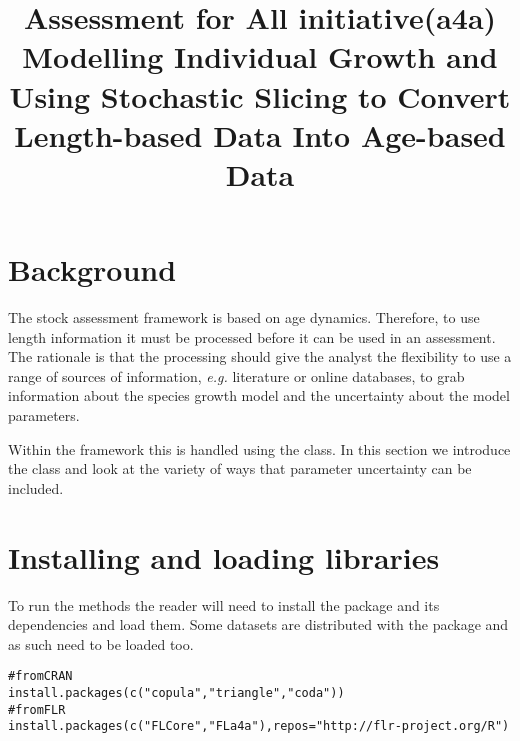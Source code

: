 \documentclass[a4paper,english,10pt]{article}\usepackage[]{graphicx}\usepackage[]{color}
\makeatletter
\newcommand{\hlstr}[1]{\textcolor[rgb]{0.063,0.58,0.627}{#1}}%
\newcommand{\hlcom}[1]{\textcolor[rgb]{0.588,0.588,0.588}{#1}}%
\newcommand{\hlstd}[1]{\textcolor[rgb]{0.196,0.196,0.196}{#1}}%
\newcommand{\hlkwc}[1]{\textcolor[rgb]{0,0.631,0.314}{#1}}%
\newcommand{\hlkwd}[1]{\textcolor[rgb]{0.78,0.227,0.412}{#1}}%
\newenvironment{kframe}{%
 \def\at@end@of@kframe{}%
 \ifinner\ifhmode%
  \def\at@end@of@kframe{\end{minipage}}%
  \begin{minipage}{\columnwidth}%
 \fi\fi%
 \def\FrameCommand##1{\hskip\@totalleftmargin \hskip-\fboxsep
 \colorbox{shadecolor}{##1}\hskip-\fboxsep
     \hskip-\linewidth \hskip-\@totalleftmargin \hskip\columnwidth}%
 \MakeFramed {\advance\hsize-\width
   \@totalleftmargin\z@ \linewidth\hsize
   \@setminipage}}%
 {\par\unskip\endMakeFramed%
 \at@end@of@kframe}
\newenvironment{knitrout}{}{} %
\makeatother
\begin{document}
\title{Assessment for All initiative(a4a) \\ Modelling Individual Growth and Using Stochastic Slicing to Convert Length-based Data Into Age-based Data}



\maketitle


\newpage
\tableofcontents
\newpage



\section{Background}

The \aFa stock assessment framework is based on age dynamics. Therefore, to use length information it must be processed before it can be used in an assessment. The rationale is that the processing should give the analyst the flexibility to use a range of sources of information, \emph{e.g.} literature or online databases, to grab information about the species growth model and the uncertainty about the model parameters.

Within the \aFa framework this is handled using the  class. In this section we introduce the  class and look at the variety of ways that parameter uncertainty can be included.




\section{Installing and loading libraries}

To run the  methods the reader will need to install the package and its dependencies and load them. Some datasets are distributed with the package and as such need to be loaded too.

\begin{knitrout}
\color{fgcolor}\begin{kframe}
\begin{alltt}
\hlcom{# from CRAN}
\hlkwd{install.packages}\hlstd{(}\hlkwd{c}\hlstd{(}\hlstr{"copula"}\hlstd{,} \hlstr{"triangle"}\hlstd{,} \hlstr{"coda"}\hlstd{))}
\hlcom{# from FLR}
\hlkwd{install.packages}\hlstd{(}\hlkwd{c}\hlstd{(}\hlstr{"FLCore"}\hlstd{,} \hlstr{"FLa4a"}\hlstd{),} \hlkwc{repos} \hlstd{=} \hlstr{"http://flr-project.org/R"}\hlstd{)}
\end{alltt}
\end{kframe}
\end{knitrout}
\end{document}
